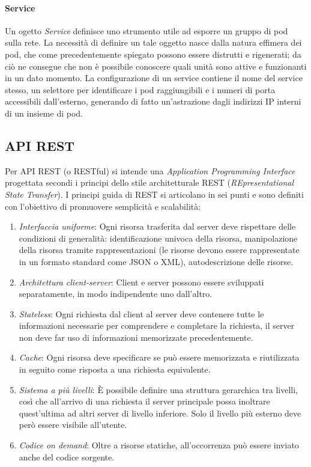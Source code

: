 \paragraph{Service}
	Un ogetto \emph{Service} definisce uno strumento utile ad esporre un gruppo di pod sulla rete.
	La necessità di definire un tale oggetto nasce dalla natura effimera dei pod, che come precedentemente spiegato possono essere distrutti e rigenerati;
	da ciò ne consegue che non è possibile conoscere quali unità sono attive e funzionanti in un dato momento.
	La configurazione di un service contiene il nome del service stesso, un selettore per identificare i pod raggiungibili e i numeri di porta accessibili dall'esterno, generando di fatto un'astrazione dagli indirizzi IP interni di un insieme di pod\cite{doc:kube-service}.
	
	
\subsection{API REST}
	
	Per API REST (o RESTful) si intende una \emph{Application Programming Interface} progettata secondi i principi dello stile architetturale REST (\emph{REpresentational State Transfer}).
	I principi guida di REST si articolano in sei punti e sono definiti con l'obiettivo di promuovere semplicità e scalabilità:
	
	\begin{enumerate}
		\item \emph{Interfaccia uniforme}:
			Ogni risorsa trasferita dal server deve rispettare delle condizioni di generalità: identificazione univoca della risorsa,
			manipolazione della risorsa tramite rappresentazioni (le risorse devono essere rappresentate in un formato standard come JSON o XML),
			autodescrizione delle risorse.
		
		\item \emph{Architettura client-server}:
			Client e server possono essere sviluppati separatamente, in modo indipendente uno dall'altro.
		
		\item \emph{Stateless}:
			Ogni richiesta dal client al server deve contenere tutte le informazioni necessarie per comprendere e completare la richiesta, il server non deve far uso di informazioni memorizzate precedentemente.
		
		\item \emph{Cache}:
			Ogni risorsa deve specificare se può essere memorizzata e riutilizzata in seguito come risposta a una richiesta equivalente.
		
		\item \emph{Sistema a più livelli}:
			\`E possibile definire una struttura gerarchica tra livelli, così che all'arrivo di una richiesta il server principale possa inoltrare quest'ultima ad altri server di livello inferiore.
			Solo il livello più esterno deve però essere visibile all'utente.
		
		\item \emph{Codice on demand}:
			Oltre a risorse statiche, all'occorrenza può essere inviato anche del codice sorgente.
	\end{enumerate}
	
